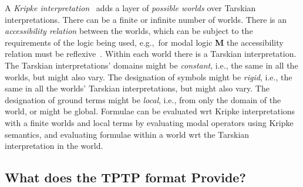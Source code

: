 \documentclass{easychair}
\begin{document}
A \emph{Kripke interpretation}~\cite{Kri63} adds a layer of \emph{possible worlds} over Tarskian 
interpretations.
There can be a finite or infinite number of worlds.
There is an \emph{accessibility relation} between the worlds, which can be subject to the
requirements of the logic being used, e.g.,~for modal logic \textbf{M} the accessibility 
relation must be reflexive~\cite{Gar18}.
Within each world there is a Tarskian interpretation. 
The Tarskian interpretations' domains might be \emph{constant}, i.e., the same in all the worlds,
but might also vary.
The designation of symbols might be \emph{rigid}, i.e., the same in all the worlds' Tarskian 
interpretations, but might also vary.
The designation of ground terms might be \emph{local}, i.e., from only the domain of the world,
or might be global.
Formulae can be evaluated wrt Kripke interpretations with a finite worlds and local terms by
evaluating modal operators using Kripke semantics, and
evaluating formulae within a world wrt the Tarskian interpretation in the world.

\subsection{What does the TPTP format Provide?}
\label{TPTPProvides}
\end{document}
